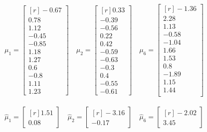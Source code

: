 \documentclass{article}
\begin{document}
\begin{equation}\begin{array}{lll}
		{\mu_{1}=\begin{bmatrix*}[r] -0.67 \\	0.78 \\	1.12 \\	-0.45 \\	-0.85 \\	1.18 \\	1.27 \\	0.6 \\ -0.8 \\ 	1.11 \\	1.23	\end{bmatrix*} \quad }
		{\mu_{2}=\begin{bmatrix*}[r]0.33 \\	-0.39 \\	-0.56 \\	0.22 \\	0.42 \\	-0.59 \\	-0.63 \\ 	-0.3 \\ 	0.4 \\	-0.55 \\	-0.61
				\end{bmatrix*} \quad }
		{\mu_{6}=\begin{bmatrix*}[r] -1.36 \\	2.28	\\1.13 \\	-0.58 \\	-1.04 \\	1.66 \\	1.53 \\	0.8 \\-1.89 \\ 	1.15 \\	1.44 \\
				\end{bmatrix*} \quad }
			\end{array}
\end{equation}

\begin{equation}\begin{array}{lll}
{\hat{\mu}_{1}=\begin{bmatrix*}[r]1.51	\\ 0.08
		\end{bmatrix*} \quad }
{\hat{\mu}_{2}=\begin{bmatrix*}[r]-3.16 \\	-0.17
		\end{bmatrix*} \quad }
{\hat{\mu}_{6}=\begin{bmatrix*}[r]-2.02 \\	3.45
		\end{bmatrix*} \quad }
\end{array}
\end{equation}
\end{document}
